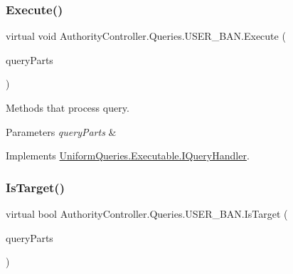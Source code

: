 \subsubsection{\texorpdfstring{Execute()}{Execute()}}
{\footnotesize\ttfamily virtual void Authority\+Controller.\+Queries.\+U\+S\+E\+R\+\_\+\+B\+A\+N.\+Execute (\begin{DoxyParamCaption}\item[{\mbox{\hyperlink{struct_uniform_queries_1_1_query_part}{Query\+Part}} \mbox{[}$\,$\mbox{]}}]{query\+Parts }\end{DoxyParamCaption})\hspace{0.3cm}{\ttfamily [virtual]}}



Methods that process query. 


\begin{DoxyParams}{Parameters}
{\em query\+Parts} & \\
\hline
\end{DoxyParams}


Implements \mbox{\hyperlink{interface_uniform_queries_1_1_executable_1_1_i_query_handler_a3268d72c0388f5e3debba4d73bdfe523}{Uniform\+Queries.\+Executable.\+I\+Query\+Handler}}.

\mbox{\label{class_authority_controller_1_1_queries_1_1_u_s_e_r___b_a_n_a4f42625ac06de3292575a043ff0addd9}} 
\subsubsection{\texorpdfstring{Is\+Target()}{IsTarget()}}
{\footnotesize\ttfamily virtual bool Authority\+Controller.\+Queries.\+U\+S\+E\+R\+\_\+\+B\+A\+N.\+Is\+Target (\begin{DoxyParamCaption}\item[{\mbox{\hyperlink{struct_uniform_queries_1_1_query_part}{Query\+Part}} \mbox{[}$\,$\mbox{]}}]{query\+Parts }\end{DoxyParamCaption})\hspace{0.3cm}{\ttfamily [virtual]}}



